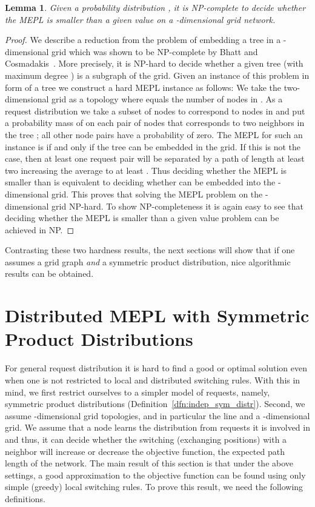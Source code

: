 \documentclass[conference]{IEEEtran}
\newtheorem{lemma}{Lemma}
\begin{document}
\begin{lemma}\label{lem:2Dhard}\label{LEM:2DHARD}
Given a probability distribution , it is NP-complete to decide whether the MEPL is smaller than a given value on a -dimensional grid network.  
\end{lemma}
\begin{proof}
We describe a reduction from the problem of embedding a tree in a -dimensional grid which was shown to be NP-complete by Bhatt and Cosmadakis~\cite{bhatt1987complexity}. More precisely, it is NP-hard to decide whether a given tree  (with maximum degree ) is a subgraph of the grid. Given an instance of this problem in form of a tree  we construct a hard MEPL instance as follows: We take the two-dimensional grid  as a topology where  equals the number of nodes in . As a request distribution we take a subset of  nodes to correspond to nodes in  and put a probability mass of  on each pair of nodes that corresponds to two neighbors in the tree ; all other  node pairs have a probability of zero. The MEPL for such an instance is  if and only if the tree can be embedded in the grid. If this is not the case, then at least one request pair will be separated by a path of length at least two increasing the average to at least . Thus deciding whether the MEPL is smaller than  is equivalent to deciding whether  can be embedded into the -dimensional grid. This proves that solving the MEPL problem on the -dimensional grid NP-hard. To show NP-completeness it is again easy to see that deciding whether the MEPL is smaller than a given value problem can be achieved in NP. 
\end{proof}

Contrasting these two hardness results, the next sections will show that if one assumes a grid graph \emph{and} a symmetric product distribution, nice algorithmic results can be obtained. 

\section{Distributed MEPL with Symmetric Product Distributions} \label{sec:product}

For general request distribution it is hard to find a good or optimal solution even when one is not restricted to local and distributed switching rules. With this in mind, we first restrict ourselves to a simpler model of requests, namely, symmetric product distributions (Definition~\ref{dfn:indep_sym_distr}). Second, we assume -dimensional grid topologies, and in particular the line and a -dimensional grid. We assume that a node learns the distribution from requests it is involved in and thus, it can decide whether the switching (exchanging positions) with a  neighbor will increase or decrease the objective function, the expected path length of the network. 
The main result of this section is that under the above settings, a good approximation to the objective function can be found using only simple (greedy) local switching rules. To prove this result, we need the following definitions.
\end{document}
